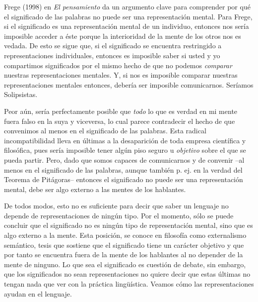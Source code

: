 \documentclass[]{book}
\begin{document}
\begin{refsection}
Frege (1998) en \emph{El pensamiento} da un argumento clave para
comprender por qué el significado de las palabras no puede ser una
representación mental. Para Frege, si el significado es una
representación mental de un individuo, entonces nos sería imposible
acceder a éste porque la interioridad de la mente de los otros nos es
vedada. De esto se sigue que, si el significado se encuentra restringido
a representaciones individuales, entonces es imposible saber si usted y
yo compartimos significados por el mismo hecho de que no podemos
\emph{comparar} nuestras representaciones mentales. Y, si nos es
imposible comparar nuestras representaciones mentales entonces, debería
ser imposible comunicarnos. Seríamos Solipsistas.

Peor aún, sería perfectamente posible que \emph{todo} lo que es verdad
en mi mente fuera falso en la suya y viceversa, lo cual parece
contradecir el hecho de que convenimos al menos en el significado de las
palabras. Esta radical incompatibilidad lleva en últimas a la
desaparición de toda empresa científica y filosófica, pues sería
imposible tener algún piso seguro u \emph{objetivo} sobre el que se
pueda partir. Pero, dado que somos capaces de comunicarnos y de convenir
--al menos en el significado de las palabras, aunque también p. ej. en
la verdad del Teorema de Pitágoras-- entonces el significado no puede
ser una representación mental, debe ser algo externo a las mentes de los
hablantes.

De todos modos, esto no es suficiente para decir que saber un lenguaje
no depende de representaciones de ningún tipo. Por el momento, sólo se
puede concluir que el significado no es ningún tipo de representación
mental, sino que es algo externo a la mente. Esta posición, se conoce en
filosofía como externalismo semántico, tesis que sostiene que el
significado tiene un carácter objetivo y que por tanto se encuentra
fuera de la mente de los hablantes al no depender de la mente de
ninguno. Lo que sea el significado es cuestión de debate, sin embargo,
que los significados no sean representaciones no quiere decir que estas
últimas no tengan nada que ver con la práctica lingüística. Veamos cómo
las representaciones ayudan en el lenguaje.


\end{refsection}
\end{document}
